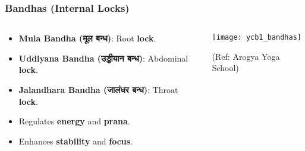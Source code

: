 \begin{frame}[fragile]\frametitle{Bandhas (Internal Locks)}


\begin{columns}
    \begin{column}[T]{0.5\linewidth}
      \begin{itemize}
        \item \textbf{Mula Bandha (मूल बन्ध)}: Root \textbf{lock}.
        \item \textbf{Uddiyana Bandha (उड्डीयान बन्ध)}: Abdominal \textbf{lock}.
        \item \textbf{Jalandhara Bandha (जालंधर बन्ध)}: Throat \textbf{lock}.
        \item Regulates \textbf{energy} and \textbf{prana}.
        \item Enhances \textbf{stability} and \textbf{focus}.
      \end{itemize}
    \end{column}
    \begin{column}[T]{0.5\linewidth}
        \begin{center}
        \texttt{[image: ycb1\_bandhas]}
				
		{\tiny (Ref: Arogya Yoga School)}	 
        \end{center}	
    \end{column}
\end{columns}
\end{frame}


